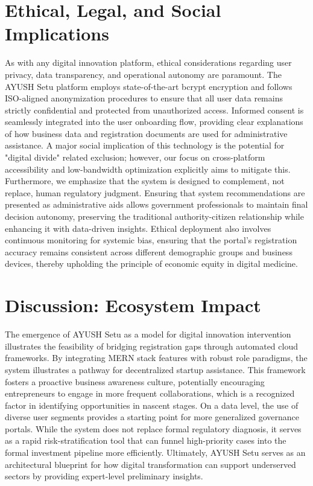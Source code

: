 \documentclass[conference]{IEEEtran}
\begin{document}
\section{Ethical, Legal, and Social Implications}
As with any digital innovation platform, ethical considerations regarding user privacy, data transparency, and operational autonomy are paramount. The AYUSH Setu platform employs state-of-the-art bcrypt encryption and follows ISO-aligned anonymization procedures to ensure that all user data remains strictly confidential and protected from unauthorized access. Informed consent is seamlessly integrated into the user onboarding flow, providing clear explanations of how business data and registration documents are used for administrative assistance. A major social implication of this technology is the potential for "digital divide" related exclusion; however, our focus on cross-platform accessibility and low-bandwidth optimization explicitly aims to mitigate this. Furthermore, we emphasize that the system is designed to complement, not replace, human regulatory judgment. Ensuring that system recommendations are presented as administrative aids allows government professionals to maintain final decision autonomy, preserving the traditional authority-citizen relationship while enhancing it with data-driven insights. Ethical deployment also involves continuous monitoring for systemic bias, ensuring that the portal's registration accuracy remains consistent across different demographic groups and business devices, thereby upholding the principle of economic equity in digital medicine.

\section{Discussion: Ecosystem Impact}
The emergence of AYUSH Setu as a model for digital innovation intervention illustrates the feasibility of bridging registration gaps through automated cloud frameworks. By integrating MERN stack features with robust role paradigms, the system illustrates a pathway for decentralized startup assistance. This framework fosters a proactive business awareness culture, potentially encouraging entrepreneurs to engage in more frequent collaborations, which is a recognized factor in identifying opportunities in nascent stages. On a data level, the use of diverse user segments provides a starting point for more generalized governance portals. While the system does not replace formal regulatory diagnosis, it serves as a rapid risk-stratification tool that can funnel high-priority cases into the formal investment pipeline more efficiently. Ultimately, AYUSH Setu serves as an architectural blueprint for how digital transformation can support underserved sectors by providing expert-level preliminary insights.
\end{document}
